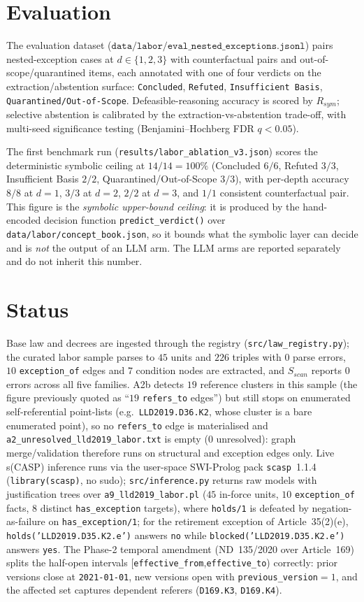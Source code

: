 \documentclass[11pt]{article}
\begin{document}
\section{Evaluation}
The evaluation dataset ($\texttt{data/labor/eval\_nested\_exceptions.jsonl}$) pairs
nested-exception cases at $d\in\{1,2,3\}$ with counterfactual pairs and
out-of-scope/quarantined items, each annotated with one of four verdicts on the
extraction/abstention surface: \texttt{Concluded}, \texttt{Refuted},
\texttt{Insufficient Basis}, \texttt{Quarantined/Out-of-Scope}. Defeasible-reasoning
accuracy is scored by $R_{sym}$; selective abstention is calibrated by the
extraction-vs-abstention trade-off, with multi-seed significance testing
(Benjamini--Hochberg FDR $q<0.05$).

The first benchmark run (\texttt{results/labor\_ablation\_v3.json}) scores the
deterministic symbolic ceiling at $14/14 = 100\%$ (Concluded $6/6$, Refuted $3/3$,
Insufficient Basis $2/2$, Quarantined/Out-of-Scope $3/3$), with per-depth accuracy
$8/8$ at $d{=}1$, $3/3$ at $d{=}2$, $2/2$ at $d{=}3$, and $1/1$ consistent
counterfactual pair. This figure is the \emph{symbolic upper-bound ceiling}: it is
produced by the hand-encoded decision function \texttt{predict\_verdict()} over
\texttt{data/labor/concept\_book.json}, so it bounds what the symbolic layer can decide
and is \emph{not} the output of an LLM arm. The LLM arms are reported separately and do
not inherit this number.

\section{Status}
Base law and decrees are ingested through the registry (\texttt{src/law\_registry.py});
the curated labor sample parses to $45$ units and $226$ triples with $0$ parse errors,
$10$ \texttt{exception\_of} edges and $7$ condition nodes are extracted, and
$S_{scan}$ reports $0$ errors across all five families. A2b detects $19$ reference
clusters in this sample (the figure previously quoted as ``$19$ \texttt{refers\_to}
edges'') but still stops on enumerated self-referential point-lists
(e.g.\ \texttt{LLD2019.D36.K2}, whose cluster is a bare enumerated point), so no \texttt{refers\_to} edge
is materialised and \texttt{a2\_unresolved\_lld2019\_labor.txt} is empty
($0$ unresolved): graph merge/validation therefore runs on structural and exception
edges only. Live s(CASP) inference runs via
the user-space SWI-Prolog pack \texttt{scasp}~1.1.4 (\texttt{library(scasp)}, no sudo);
\texttt{src/inference.py} returns raw models with justification trees over
\texttt{a9\_lld2019\_labor.pl} ($45$ in-force units, $10$ \texttt{exception\_of} facts,
$8$ distinct \texttt{has\_exception} targets), where \texttt{holds/1} is defeated
by negation-as-failure on \texttt{has\_exception/1}; for the retirement exception of
Article~35(2)(e), \texttt{holds('LLD2019.D35.K2.e')} answers \texttt{no} 
while \texttt{blocked('LLD2019.D35.K2.e')} answers \texttt{yes}. The Phase-2 temporal amendment
(ND~135/2020 over Article~169) splits the half-open intervals
[\texttt{effective\_from},\texttt{effective\_to}) correctly: prior versions close at
\texttt{2021-01-01}, new versions open with \texttt{previous\_version}$=1$, and the
affected set captures dependent referers (\texttt{D169.K3}, \texttt{D169.K4}).
\end{document}
